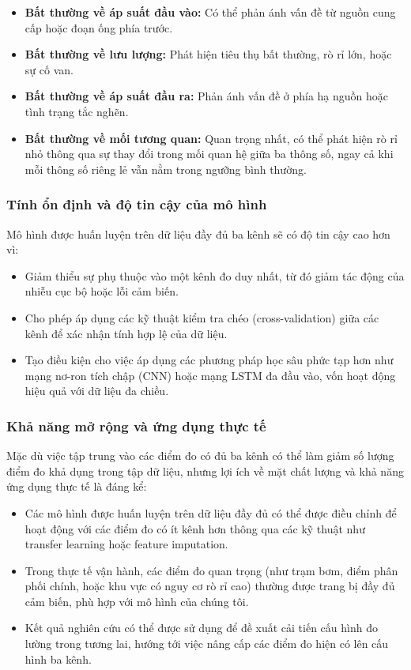 \begin{itemize}
    \item \textbf{Bất thường về áp suất đầu vào:} Có thể phản ánh vấn đề từ nguồn cung cấp hoặc đoạn ống phía trước.
    \item \textbf{Bất thường về lưu lượng:} Phát hiện tiêu thụ bất thường, rò rỉ lớn, hoặc sự cố van.
    \item \textbf{Bất thường về áp suất đầu ra:} Phản ánh vấn đề ở phía hạ nguồn hoặc tình trạng tắc nghẽn.
    \item \textbf{Bất thường về mối tương quan:} Quan trọng nhất, có thể phát hiện rò rỉ nhỏ thông qua sự thay đổi trong mối quan hệ giữa ba thông số, ngay cả khi mỗi thông số riêng lẻ vẫn nằm trong ngưỡng bình thường.
\end{itemize}

\subsubsection{Tính ổn định và độ tin cậy của mô hình}
Mô hình được huấn luyện trên dữ liệu đầy đủ ba kênh sẽ có độ tin cậy cao hơn vì:

\begin{itemize}
    \item Giảm thiểu sự phụ thuộc vào một kênh đo duy nhất, từ đó giảm tác động của nhiễu cục bộ hoặc lỗi cảm biến.
    \item Cho phép áp dụng các kỹ thuật kiểm tra chéo (cross-validation) giữa các kênh để xác nhận tính hợp lệ của dữ liệu.
    \item Tạo điều kiện cho việc áp dụng các phương pháp học sâu phức tạp hơn như mạng nơ-ron tích chập (CNN) hoặc mạng LSTM đa đầu vào, vốn hoạt động hiệu quả với dữ liệu đa chiều.
\end{itemize}

\subsubsection{Khả năng mở rộng và ứng dụng thực tế}
Mặc dù việc tập trung vào các điểm đo có đủ ba kênh có thể làm giảm số lượng điểm đo khả dụng trong tập dữ liệu, nhưng lợi ích về mặt chất lượng và khả năng ứng dụng thực tế là đáng kể:

\begin{itemize}
    \item Các mô hình được huấn luyện trên dữ liệu đầy đủ có thể được điều chỉnh để hoạt động với các điểm đo có ít kênh hơn thông qua các kỹ thuật như transfer learning hoặc feature imputation.
    \item Trong thực tế vận hành, các điểm đo quan trọng (như trạm bơm, điểm phân phối chính, hoặc khu vực có nguy cơ rò rỉ cao) thường được trang bị đầy đủ cảm biến, phù hợp với mô hình của chúng tôi.
    \item Kết quả nghiên cứu có thể được sử dụng để đề xuất cải tiến cấu hình đo lường trong tương lai, hướng tới việc nâng cấp các điểm đo hiện có lên cấu hình ba kênh.
\end{itemize}

